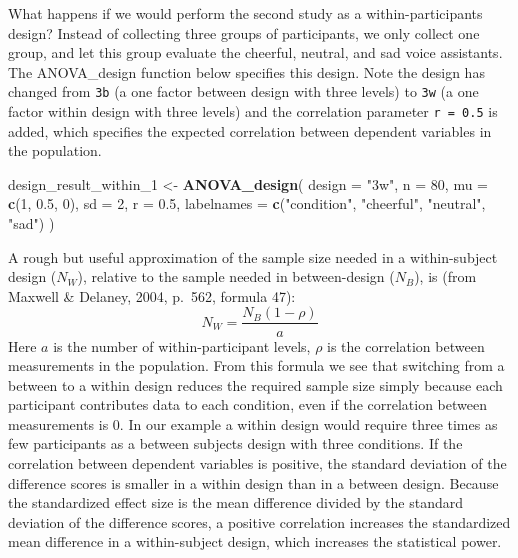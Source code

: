 \documentclass[
  ,man,floatsintext]{apa6}
\newenvironment{Shaded}{\begin{snugshade}}{\end{snugshade}}
\newcommand{\DataTypeTok}[1]{\textcolor[rgb]{0.13,0.29,0.53}{#1}}
\newcommand{\DecValTok}[1]{\textcolor[rgb]{0.00,0.00,0.81}{#1}}
\newcommand{\FloatTok}[1]{\textcolor[rgb]{0.00,0.00,0.81}{#1}}
\newcommand{\KeywordTok}[1]{\textcolor[rgb]{0.13,0.29,0.53}{\textbf{#1}}}
\newcommand{\NormalTok}[1]{#1}
\newcommand{\StringTok}[1]{\textcolor[rgb]{0.31,0.60,0.02}{#1}}
\begin{document}
What happens if we would perform the second study as a within-participants design?
Instead of collecting three groups of participants, we only collect one group, and let this group evaluate the cheerful, neutral, and sad voice assistants.
The ANOVA\_design function below specifies this design.
Note the design has changed from \texttt{3b} (a one factor between design with three levels) to \texttt{3w} (a one factor within design with three levels) and the correlation parameter \texttt{r\ =\ 0.5} is added, which specifies the expected correlation between dependent variables in the population.

\begin{Shaded}
\begin{Highlighting}[]
\NormalTok{design_result_within_}\DecValTok{1}\NormalTok{ <-}\StringTok{ }\KeywordTok{ANOVA_design}\NormalTok{(}
  \DataTypeTok{design =} \StringTok{"3w"}\NormalTok{,}
  \DataTypeTok{n =} \DecValTok{80}\NormalTok{,}
  \DataTypeTok{mu =} \KeywordTok{c}\NormalTok{(}\DecValTok{1}\NormalTok{, }\FloatTok{0.5}\NormalTok{, }\DecValTok{0}\NormalTok{),}
  \DataTypeTok{sd =} \DecValTok{2}\NormalTok{,}
  \DataTypeTok{r =} \FloatTok{0.5}\NormalTok{,}
  \DataTypeTok{labelnames =} \KeywordTok{c}\NormalTok{(}\StringTok{"condition"}\NormalTok{, }\StringTok{"cheerful"}\NormalTok{, }\StringTok{"neutral"}\NormalTok{, }\StringTok{"sad"}\NormalTok{)}
\NormalTok{)}
\end{Highlighting}
\end{Shaded}

A rough but useful approximation of the sample size needed in a within-subject design (\(N_W\)), relative to the sample needed in between-design (\(N_B\)), is (from Maxwell \& Delaney, 2004, p.~562, formula 47):
\begin{equation}
N_{W}=\frac{N_{B}(1-\rho)}{a} \label{eq:within-n}
\end{equation}
Here \(a\) is the number of within-participant levels, \(\rho\) is the correlation between measurements in the population.
From this formula we see that switching from a between to a within design reduces the required sample size simply because each participant contributes data to each condition, even if the correlation between measurements is 0.
In our example a within design would require three times as few participants as a between subjects design with three conditions.
If the correlation between dependent variables is positive, the standard deviation of the difference scores is smaller in a within design than in a between design.
Because the standardized effect size is the mean difference divided by the standard deviation of the difference scores, a positive correlation increases the standardized mean difference in a within-subject design, which increases the statistical power.
\end{document}
